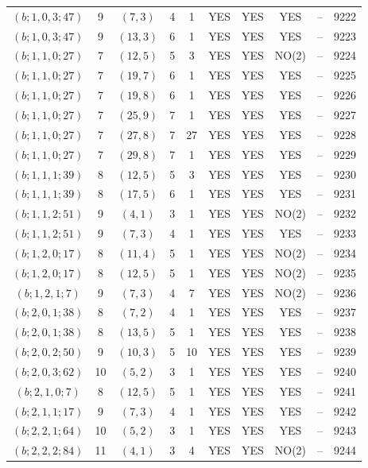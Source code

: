 \begin{longtable}{|c|c|c|c|c|c|c|c|c|c|}
$(b; 1, 0, 3; 47)$ & 9 & $(7, 3)$ & 4 & 1 & YES & YES & YES & -- & 9222\\
$(b; 1, 0, 3; 47)$ & 9 & $(13, 3)$ & 6 & 1 & YES & YES & YES & -- & 9223\\
$(b; 1, 1, 0; 27)$ & 7 & $(12, 5)$ & 5 & 3 & YES & YES & NO(2) & -- & 9224\\
$(b; 1, 1, 0; 27)$ & 7 & $(19, 7)$ & 6 & 1 & YES & YES & YES & -- & 9225\\
$(b; 1, 1, 0; 27)$ & 7 & $(19, 8)$ & 6 & 1 & YES & YES & YES & -- & 9226\\
$(b; 1, 1, 0; 27)$ & 7 & $(25, 9)$ & 7 & 1 & YES & YES & YES & -- & 9227\\
$(b; 1, 1, 0; 27)$ & 7 & $(27, 8)$ & 7 & 27 & YES & YES & YES & -- & 9228\\
$(b; 1, 1, 0; 27)$ & 7 & $(29, 8)$ & 7 & 1 & YES & YES & YES & -- & 9229\\
$(b; 1, 1, 1; 39)$ & 8 & $(12, 5)$ & 5 & 3 & YES & YES & YES & -- & 9230\\
$(b; 1, 1, 1; 39)$ & 8 & $(17, 5)$ & 6 & 1 & YES & YES & YES & -- & 9231\\
$(b; 1, 1, 2; 51)$ & 9 & $(4, 1)$ & 3 & 1 & YES & YES & NO(2) & -- & 9232\\
$(b; 1, 1, 2; 51)$ & 9 & $(7, 3)$ & 4 & 1 & YES & YES & YES & -- & 9233\\
$(b; 1, 2, 0; 17)$ & 8 & $(11, 4)$ & 5 & 1 & YES & YES & NO(2) & -- & 9234\\
$(b; 1, 2, 0; 17)$ & 8 & $(12, 5)$ & 5 & 1 & YES & YES & NO(2) & -- & 9235\\
$(b; 1, 2, 1; 7)$ & 9 & $(7, 3)$ & 4 & 7 & YES & YES & NO(2) & -- & 9236\\
$(b; 2, 0, 1; 38)$ & 8 & $(7, 2)$ & 4 & 1 & YES & YES & YES & -- & 9237\\
$(b; 2, 0, 1; 38)$ & 8 & $(13, 5)$ & 5 & 1 & YES & YES & YES & -- & 9238\\
$(b; 2, 0, 2; 50)$ & 9 & $(10, 3)$ & 5 & 10 & YES & YES & YES & -- & 9239\\
$(b; 2, 0, 3; 62)$ & 10 & $(5, 2)$ & 3 & 1 & YES & YES & YES & -- & 9240\\
$(b; 2, 1, 0; 7)$ & 8 & $(12, 5)$ & 5 & 1 & YES & YES & YES & -- & 9241\\
$(b; 2, 1, 1; 17)$ & 9 & $(7, 3)$ & 4 & 1 & YES & YES & YES & -- & 9242\\
$(b; 2, 2, 1; 64)$ & 10 & $(5, 2)$ & 3 & 1 & YES & YES & YES & -- & 9243\\
$(b; 2, 2, 2; 84)$ & 11 & $(4, 1)$ & 3 & 4 & YES & YES & NO(2) & -- & 9244\\

\end{longtable}
